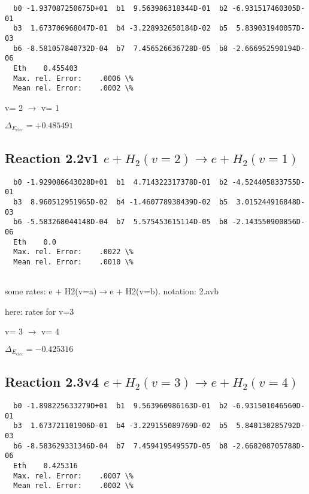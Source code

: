 \documentclass[12pt,dvipdfmx]{article}
\begin{document}
\begin{small}\begin{verbatim}
  b0 -1.937087250675D+01  b1  9.563986318344D-01  b2 -6.931517460305D-01
  b3  1.673706968047D-01  b4 -3.228932650184D-02  b5  5.839031940057D-03
  b6 -8.581057840732D-04  b7  7.456526636728D-05  b8 -2.666952590194D-06
  Eth    0.455403
  Max. rel. Error:    .0006 \%
  Mean rel. Error:    .0002 \%

\end{verbatim}\end{small}

  v=  2 $\rightarrow$ v= 1

$\Delta_{E_{elec}}=+0.485491$

\subsection{
Reaction 2.2v1
$ e + H_2(v=2) \rightarrow e + H_2(v=1) $
}


\begin{small}\begin{verbatim}
  b0 -1.929086643028D+01  b1  4.714322317378D-01  b2 -4.524405833755D-01
  b3  8.960512951965D-02  b4 -1.460778938439D-02  b5  3.015244916848D-03
  b6 -5.583268044148D-04  b7  5.575453615114D-05  b8 -2.143550900856D-06
  Eth    0.0
  Max. rel. Error:    .0022 \%
  Mean rel. Error:    .0010 \%


\end{verbatim}\end{small}

\newpage
some rates: e + H2(v=a)$\rightarrow$e + H2(v=b). notation: 2.avb

here: rates for v=3

  v=  3 $\rightarrow$ v= 4

$\Delta_{E_{elec}}=-0.425316$

\subsection{
Reaction 2.3v4
$ e + H_2(v=3) \rightarrow e + H_2(v=4) $
}


\begin{small}\begin{verbatim}
  b0 -1.898225633279D+01  b1  9.563960986163D-01  b2 -6.931501046560D-01
  b3  1.673721101906D-01  b4 -3.229155089769D-02  b5  5.840130285792D-03
  b6 -8.583629331346D-04  b7  7.459419549557D-05  b8 -2.668208705788D-06
  Eth    0.425316
  Max. rel. Error:    .0007 \%
  Mean rel. Error:    .0002 \%

\end{verbatim}\end{small}
\end{document}
